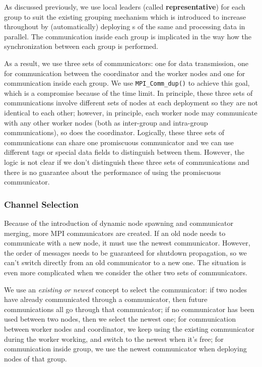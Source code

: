 As discussed previously, we use local leaders (called \textbf{representative}) for each group to suit the existing grouping mechanism which is introduced to increase throughout by (automatically) deploying \tPEDup{}s of the same \tPEInst and processing data in parallel. The communication inside each group is implicated in the way how the synchronization between each group is performed.

As a result, we use three sets of communicators: one for data transmission, one for communication between the coordinator and the worker nodes and one for communication inside each group. We use \lstinline|MPI_Comm_dup()| to achieve this goal, which is a compromise because of the time limit. In principle, these three sets of communications involve different sets of nodes at each deployment so they are not identical to each other; however, in principle, each worker node may communicate with any other worker nodes (both as inter-group and intra-group communications), so does the coordinator. Logically, these three sets of communications can share one promiscuous communicator and we can use different tags or special data fields to distinguish between them. However, the logic is not clear if we don't distinguish these three sets of communications and there is no guarantee about the performance of using the promiscuous communicator.

\subsubsection{Channel Selection}
Because of the introduction of dynamic node spawning and communicator merging, more MPI communicators are created. If an old node needs to communicate with a new node, it must use the newest communicator. However, the order of messages needs to be guaranteed for shutdown propagation, so we can't switch directly from an old communicator to a new one. The situation is even more complicated when we consider the other two sets of communicators.

We use an \emph{existing or newest} concept to select the communicator: if two nodes have already communicated through a communicator, then future communications all go through that communicator; if no communicator has been used between two nodes, then we select the newest one; for communication between worker nodes and coordinator, we keep using the existing communicator during the worker working, and switch to the newest when it's free; for communication inside group, we use the newest communicator when deploying nodes of that group.
